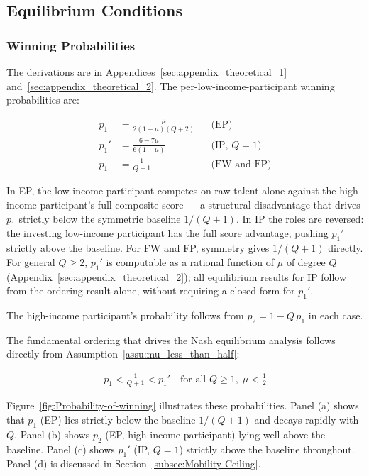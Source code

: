 \documentclass[
    oneside,
    fontsize=10pt,leqno]{article}
\begin{document}
\subsection{\label{subsec:Two-player-Discrete-Model}Equilibrium Conditions}

\noindent

\subsubsection{Winning Probabilities}

The derivations are in Appendices~\ref{sec:appendix_theoretical_1}
and~\ref{sec:appendix_theoretical_2}. The per-low-income-participant
winning probabilities are:

\begin{align}
p_{1} & =\frac{\mu}{2(1-\mu)(Q+2)} & & \text{(EP)}\label{eq:p1_caseI}\\[4pt]
p_{1}' & =\frac{6-7\mu}{6(1-\mu)} & & \text{(IP, }Q=1\text{)}\label{eq:p1prime_Q1}\\[4pt]
p_{1} & =\frac{1}{Q+1} & & \text{(FW and FP)}\label{eq:p_baseline}
\end{align}

In EP, the low-income participant competes on raw talent alone
against the high-income participant's full composite score --- a
structural disadvantage that drives $p_{1}$ strictly below the
symmetric baseline $1/(Q+1)$. In IP the roles are reversed:
the investing low-income participant has the full score advantage,
pushing $p_{1}'$ strictly above the baseline. For FW and FP,
symmetry gives $1/(Q+1)$ directly. For general $Q\geq2$, $p_{1}'$
is computable as a rational function of $\mu$ of degree $Q$
(Appendix~\ref{sec:appendix_theoretical_2}); all equilibrium
results for IP follow from the ordering result alone, without
requiring a closed form for $p_{1}'$.

The high-income participant's probability follows from $p_{2}=1-Q\,p_{1}$
in each case.

\medskip

The fundamental ordering that drives the Nash equilibrium analysis
follows directly from Assumption~\ref{assu:mu_less_than_half}:

\begin{gather}
p_{1}<\frac{1}{Q+1}<p_{1}'\quad\text{for all }Q\geq1,\;\mu<\tfrac{1}{2}\label{eq:ordering}
\end{gather}

Figure~\ref{fig:Probability-of-winning} illustrates these probabilities.
Panel (a) shows that $p_{1}$ (EP) lies strictly below the baseline
$1/(Q+1)$ and decays rapidly with $Q$. Panel (b) shows $p_{2}$
(EP, high-income participant) lying well above the baseline. Panel (c)
shows $p_{1}'$ (IP, $Q=1$) strictly above the baseline throughout.
Panel (d) is discussed in Section~\ref{subsec:Mobility-Ceiling}.
\end{document}
